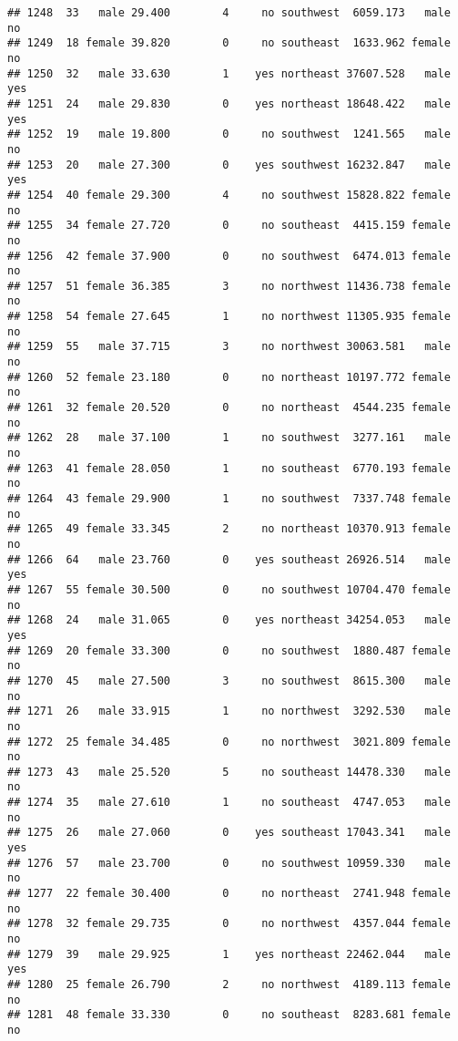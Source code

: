 \documentclass[
]{article}
\begin{document}
\begin{verbatim}
## 1248  33   male 29.400        4     no southwest  6059.173   male       no
## 1249  18 female 39.820        0     no southeast  1633.962 female       no
## 1250  32   male 33.630        1    yes northeast 37607.528   male      yes
## 1251  24   male 29.830        0    yes northeast 18648.422   male      yes
## 1252  19   male 19.800        0     no southwest  1241.565   male       no
## 1253  20   male 27.300        0    yes southwest 16232.847   male      yes
## 1254  40 female 29.300        4     no southwest 15828.822 female       no
## 1255  34 female 27.720        0     no southeast  4415.159 female       no
## 1256  42 female 37.900        0     no southwest  6474.013 female       no
## 1257  51 female 36.385        3     no northwest 11436.738 female       no
## 1258  54 female 27.645        1     no northwest 11305.935 female       no
## 1259  55   male 37.715        3     no northwest 30063.581   male       no
## 1260  52 female 23.180        0     no northeast 10197.772 female       no
## 1261  32 female 20.520        0     no northeast  4544.235 female       no
## 1262  28   male 37.100        1     no southwest  3277.161   male       no
## 1263  41 female 28.050        1     no southeast  6770.193 female       no
## 1264  43 female 29.900        1     no southwest  7337.748 female       no
## 1265  49 female 33.345        2     no northeast 10370.913 female       no
## 1266  64   male 23.760        0    yes southeast 26926.514   male      yes
## 1267  55 female 30.500        0     no southwest 10704.470 female       no
## 1268  24   male 31.065        0    yes northeast 34254.053   male      yes
## 1269  20 female 33.300        0     no southwest  1880.487 female       no
## 1270  45   male 27.500        3     no southwest  8615.300   male       no
## 1271  26   male 33.915        1     no northwest  3292.530   male       no
## 1272  25 female 34.485        0     no northwest  3021.809 female       no
## 1273  43   male 25.520        5     no southeast 14478.330   male       no
## 1274  35   male 27.610        1     no southeast  4747.053   male       no
## 1275  26   male 27.060        0    yes southeast 17043.341   male      yes
## 1276  57   male 23.700        0     no southwest 10959.330   male       no
## 1277  22 female 30.400        0     no northeast  2741.948 female       no
## 1278  32 female 29.735        0     no northwest  4357.044 female       no
## 1279  39   male 29.925        1    yes northeast 22462.044   male      yes
## 1280  25 female 26.790        2     no northwest  4189.113 female       no
## 1281  48 female 33.330        0     no southeast  8283.681 female       no

\end{verbatim}
\end{document}
